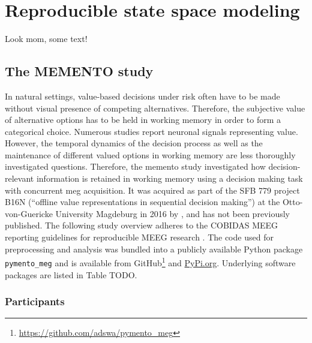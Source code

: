 

\chapter{Reproducible state space modeling}
\label{k5}

Look mom, some text!


\section{The MEMENTO study}

In natural settings, value-based decisions under risk often have to be made without visual presence of competing alternatives.
Therefore, the subjective value of alternative options has to be held in working memory in order to form a categorical choice.
Numerous studies report neuronal signals representing value.
However, the temporal dynamics of the decision process as well as the maintenance of different valued options in working memory are less thoroughly investigated questions.
Therefore, the memento study investigated how decision-relevant information is retained in working memory using a decision making task with concurrent \gls{meg} acquisition.
It was acquired as part of the SFB 779 project B16N (``offline value representations in sequential decision making'') at the Otto-von-Guericke University Magdeburg in 2016 by \citet{kaiser}, and has not been previously published.
The following study overview adheres to the COBIDAS MEEG reporting guidelines for reproducible MEEG research \citep{pernet2020issues}.
The code used for preprocessing and analysis was bundled into a publicly available Python package \texttt{pymento\_meg} and is available from GitHub\footnote{\url{https://github.com/adswa/pymento_meg}} and \url{PyPi.org}.
Underlying software packages are listed in Table TODO.

\subsection{Participants}

